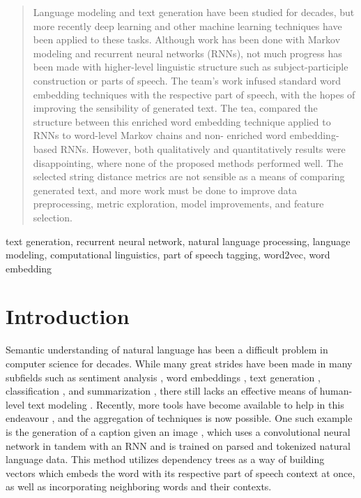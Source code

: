\documentclass[conference]{IEEEtran}
\begin{document}
\begin{abstract}
Language modeling and text generation have been studied for decades, but more recently deep learning and other machine learning techniques have been applied to these tasks. Although work has been done with Markov modeling and recurrent neural networks (RNNs), not much progress has been made with higher-level linguistic structure such as subject-participle construction or parts of speech.  The team's work infused standard word embedding techniques with the respective part of speech, with the hopes of improving the sensibility of generated text. The tea, compared the structure between this enriched word embedding technique applied to RNNs to word-level Markov chains and non- enriched word embedding-based RNNs.   However, both qualitatively and quantitatively results were disappointing, where none of the proposed methods performed well. The selected string distance metrics are not sensible as a means of comparing generated text, and more work must be done to improve data preprocessing, metric exploration, model improvements, and feature selection.
\end{abstract}

\begin{IEEEkeywords}
text generation, recurrent neural network, natural language processing, language modeling, computational linguistics, part of speech tagging, word2vec, word embedding
\end{IEEEkeywords}

\section{Introduction}
Semantic understanding of natural language has been a difficult problem in computer science for decades. \cite{linell2004written} While many great strides have been made in many subfields such as sentiment analysis \cite{medhat2014sentiment}, word embeddings \cite{DBLP:journals/corr/MikolovSCCD13}, text generation \cite{sutskever2011generating}, classification \cite{dumais2001methods}, and summarization \cite{Goldstein:1999:STD:312624.312665}, there still lacks an effective means of human-level text modeling \cite{WENYIN20104031}\cite{YAN201715}\cite{BICALHO201766}. Recently, more tools have become available to help in this endeavour \cite{DBLP:journals/corr/MikolovSCCD13}\cite{bird2004nltk}\cite{honnibal2015improved}, and the aggregation of techniques is now possible. One such example is the generation of a caption given an image \cite{johnson2016densecap}, which uses a convolutional neural network in tandem with an RNN and is trained on parsed and tokenized natural language data.  This method utilizes dependency trees as a way of building vectors which embeds the word with its respective part of speech context at once, as well as incorporating neighboring words and their contexts.
\end{document}
